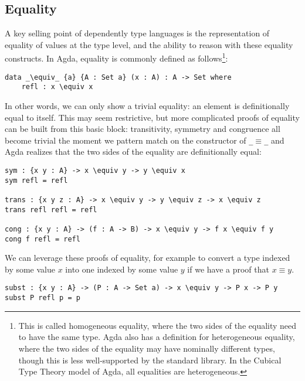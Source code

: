 \subsection{Equality}
\label{sec:tutorial:equality}
A key selling point of dependently type languages is the representation of equality of values at the type level, and the ability to reason with these equality constructs. In Agda, equality is commonly defined as follows\footnote{This is called homogeneous equality, where the two sides of the equality need to have the same type. Agda also has a definition for heterogeneous equality, where the two sides of the equality may have nominally different types, though this is less well-supported by the standard library. In the Cubical Type Theory model of Agda, all equalities are heterogeneous.}:

\begin{lstlisting}[caption={Equality in Agda},label={lst:tutorial:equality},emph={refl}]
data _\equiv_ {a} {A : Set a} (x : A) : A -> Set where
    refl : x \equiv x
\end{lstlisting}

In other words, we can only show a trivial equality: an element is definitionally equal to itself. This may seem restrictive, but more complicated proofs of equality can be built from this basic block: transitivity, symmetry and congruence all become trivial the moment we pattern match on the constructor of \texttt{\_$\equiv$\_} and Agda realizes that the two sides of the equality are definitionally equal:

\begin{lstlisting}[caption={Reasoning in Agda},label={lst:tutorial:reasoning
},emph={sym,cong,trans}]
sym : {x y : A} -> x \equiv y -> y \equiv x
sym refl = refl

trans : {x y z : A} -> x \equiv y -> y \equiv z -> x \equiv z
trans refl refl = refl

cong : {x y : A} -> (f : A -> B) -> x \equiv y -> f x \equiv f y
cong f refl = refl
\end{lstlisting}

We can leverage these proofs of equality, for example to convert a type indexed by some value $x$ into one indexed by some value $y$ if we have a proof that $x \equiv y$.

\noindent\begin{minipage}{\linewidth}
\begin{lstlisting}[caption={Substitution},label={lst:tutorial:subst},emph={subst}]
subst : {x y : A} -> (P : A -> Set a) -> x \equiv y -> P x -> P y
subst P refl p = p
\end{lstlisting}
\end{minipage}

